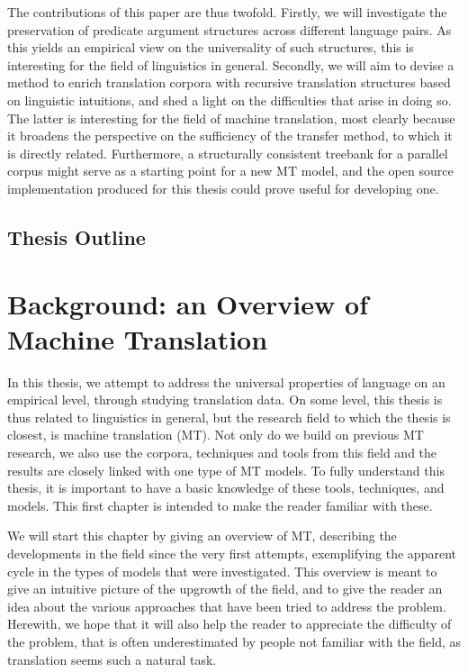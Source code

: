 \documentclass{report}
\theoremstyle{definition}
\theoremstyle{plain}
\begin{document}
The contributions of this paper are thus twofold. Firstly, we will investigate the preservation of predicate argument structures across different language pairs. As this yields an empirical view on the universality of such structures, this is interesting for the field of linguistics in general. Secondly, we will aim to devise a method to enrich translation corpora with recursive translation structures based on linguistic intuitions, and shed a light on the difficulties that arise in doing so. The latter is interesting for the field of machine translation, most clearly because it broadens the perspective on the sufficiency of the transfer method, to which it is directly related. Furthermore, a structurally consistent treebank for a parallel corpus might serve as a starting point for a new MT model, and the open source implementation produced for this thesis could prove useful for developing one.


\section*{Thesis Outline}





\chapter{Background: an Overview of Machine Translation}


In this thesis, we attempt to address the universal properties of language on an empirical level, through studying translation data. On some level, this thesis is thus related to linguistics in general, but the research field to which the thesis is closest, is machine translation (MT). Not only do we build on previous MT research, we also use the corpora, techniques and tools from this field and the results are closely linked with one type of MT models. To fully understand this thesis, it is important to have a basic knowledge of these tools, techniques, and models. This first chapter is intended to make the reader familiar with these.

We will start this chapter by giving an overview of MT, describing the developments in the field since the very first attempts, exemplifying the apparent cycle in the types of models that were investigated. This overview is meant to give an intuitive picture of the upgrowth of the field, and to give the reader an idea about the various approaches that have been tried to address the problem. Herewith, we hope that it will also help the reader to appreciate the difficulty of the problem, that is often underestimated by people not familiar with the field, as translation seems such a natural task.
\end{document}
